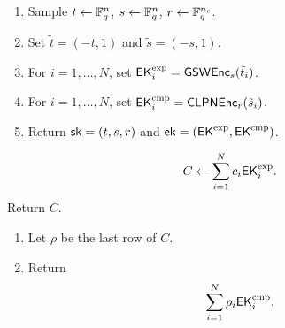\begin{algobox}
\AlgTitle{$\KeyGen$}
\begin{enumerate}
    \item Sample $t\leftarrow\mathbb{F}_q^n$, $s\leftarrow\mathbb{F}_q^n$, $r\leftarrow\mathbb{F}_q^{n_c}$.
    \item Set $\tilde{t}=(-t,1)$ and $\tilde{s}=(-s,1)$.
    \item For $i=1,\ldots,N$, set $\mathsf{EK}^{\rm exp}_i=\mathsf{GSW}\mathsf{Enc}_s(\tilde{t}_i)$.
    \item For $i=1,\ldots,N$, set $\mathsf{EK}^{\rm cmp}_i=\mathsf{CLPN}\mathsf{Enc}_r(\tilde{s}_i)$.
    \item Return $\mathsf{sk}=(t,s,r)$ and $\mathsf{ek}=(\mathsf{EK}^{\rm exp},\mathsf{EK}^{\rm cmp})$.
\end{enumerate}
\end{algobox}

\begin{algobox}
\[
    C\leftarrow\sum_{i=1}^N c_i\mathsf{EK}^{\rm exp}_i.
\]
Return $C$.
\end{algobox}

\begin{algobox}
\begin{enumerate}
    \item Let $\rho$ be the last row of $C$.
    \item Return
    \[
        \sum_{i=1}^N \rho_i\mathsf{EK}^{\rm cmp}_i.
    \]
\end{enumerate}
\end{algobox}
